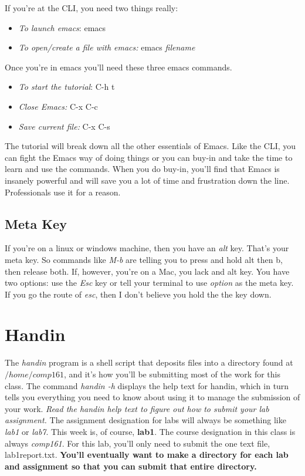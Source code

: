 \documentclass[]{tufte-handout}
\begin{document}
If you're at the CLI, you need two things really:
\begin{itemize}
\item \textit{To launch emacs}: emacs
\item \textit{To open/create a file with emacs:} emacs \textit{filename}
\end{itemize}

Once you're in emacs you'll need these three emacs commands.
\begin{itemize}
\item \textit{To start the tutorial}: C-h t
\item \textit{Close Emacs:} C-x C-c
\item \textit{Save current file:} C-x C-s
\end{itemize}

The tutorial will break down all the other essentials of Emacs.  Like the CLI, you can fight the Emacs way of doing things or you can buy-in and take the time to learn and use the commands. When you do buy-in, you'll find that Emacs is insanely powerful and will save you a lot of time and frustration down the line. Professionals use it for a reason.

\subsection{Meta Key}

If you're on a linux or windows machine, then you have an \textit{alt} key. That's your meta key. So commands like \textit{M-b} are telling you to press and hold alt then b, then release both. If, however, you're on a Mac, you lack and alt key. You have two options: use the \textit{Esc} key or tell your terminal to use \textit{option} as the meta key.  If you go the route of \textit{esc}, then I don't believe you hold the the key down.

\section{Handin}

The \textit{handin} program is a shell script that deposits files into a directory found at $ /home/comp161$, and it's how you'll be submitting most of the work for this class. The command \textit{handin -h} displays the help text for handin, which in turn tells you everything you need to know about using it to manage the submission of your work. \textit{Read the handin help text to figure out how to submit your lab assignment.} The assignment designation for labs will always be something like \textit{lab1} or \textit{lab7}.  This week is, of course, \textbf{lab1}.  The course designation in this class is always \textit{comp161}.  For this lab, you'll only need to submit the one text file, lab1report.txt.  \textbf{You'll eventually want to make a directory for each lab and assignment so that you can submit that entire directory.}
\end{document}
